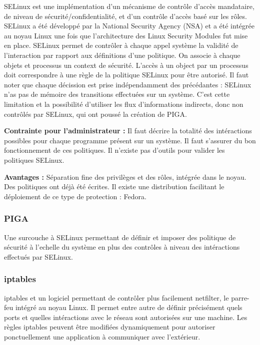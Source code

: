 SELinux est une implémentation d'un mécanisme de contrôle d'accès mandataire, de niveau de sécurité/confidentialité, et d'un contrôle d'accès basé sur les rôles. SELinux a été développé par la National Security Agency (NSA) et a été intégrée au noyau Linux une fois que l'architecture des Linux Security Modules fut mise en place. SELinux permet de contrôler à chaque appel système la validité de l'interaction par rapport aux définitions d'une politique. On associe à chaque objets et processus un context de sécurité. L'accès à un object par un processus doit correspondre à une règle de la politique SELinux pour être autorisé. Il faut noter que chaque décission est prise indépendamment des précédantes : SELinux n'as pas de mémoire des transitions effectuées sur un système. C'est cette limitation et la possibilité d'utiliser les flux d'informations indirects, donc non contrôlés par SELinux, qui ont poussé la création de PIGA.

\begin{list}{}{}
 \item \textbf{Contrainte pour l'administrateur :} Il faut décrire la totalité des intéractions possibles pour chaque programme présent sur un système. Il faut s'assurer du bon fonctionnement de ces politiques. Il n'existe pas d'outils pour valider les politiques SELinux.
 \item \textbf{Avantages :} Séparation fine des privilèges et des rôles, intégrée dans le noyau. Des politiques ont déjà été écrites. Il existe une distribution facilitant le déploiement de ce type de protection : Fedora.
\end{list}

\subsubsection{PIGA}

Une surcouche à SELinux permettant de définir et imposer des politique de sécurité à l'echelle du système en plus des contrôles à niveau des intéractions effectués par SELinux.

\subsubsection{iptables}

iptables et un logiciel permettant de contrôler plus facilement netfilter, le parre-feu intégré au noyau Linux. Il permet entre autre de définir précisément quels ports et quelles intéractions avec le réseau sont autorisées sur une machine. Les règles iptables peuvent être modifiées dynamiquement pour autoriser ponctuellement une application à communiquer avec l'extérieur.

